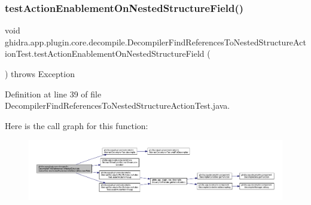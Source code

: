\subsubsection{\texorpdfstring{testActionEnablementOnNestedStructureField()}{testActionEnablementOnNestedStructureField()}}
{\footnotesize\ttfamily void ghidra.\+app.\+plugin.\+core.\+decompile.\+Decompiler\+Find\+References\+To\+Nested\+Structure\+Action\+Test.\+test\+Action\+Enablement\+On\+Nested\+Structure\+Field (\begin{DoxyParamCaption}{ }\end{DoxyParamCaption}) throws Exception\hspace{0.3cm}{\ttfamily [inline]}}



Definition at line 39 of file Decompiler\+Find\+References\+To\+Nested\+Structure\+Action\+Test.\+java.

Here is the call graph for this function\+:
\nopagebreak
\begin{figure}[H]
\begin{center}
\leavevmode
\includegraphics[width=350pt]{classghidra_1_1app_1_1plugin_1_1core_1_1decompile_1_1_decompiler_find_references_to_nested_structure_action_test_a9eaa870ca9125e4731c429ce8eb49742_cgraph}
\end{center}
\end{figure}
\mbox{\label{classghidra_1_1app_1_1plugin_1_1core_1_1decompile_1_1_decompiler_find_references_to_nested_structure_action_test_ad31c616b6ebca3744f23292f3f6a47a2}} 
